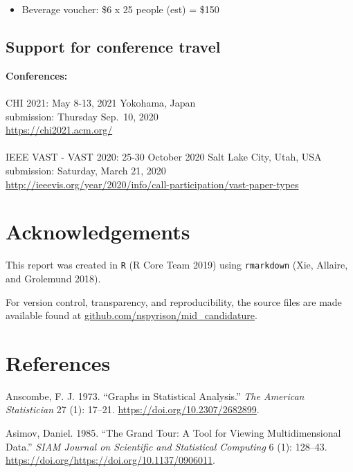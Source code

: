 \documentclass[
  11,
]{article}
\providecommand{\tightlist}{%
  \setlength{\itemsep}{0pt}\setlength{\parskip}{0pt}}
\begin{document}
\begin{itemize}
\tightlist
\item
  Beverage voucher: \$6 x 25 people (est) = \$150
\end{itemize}

\hypertarget{support-for-conference-travel}{%
\subsection{Support for conference travel}\label{support-for-conference-travel}}

\textbf{Conferences:}\\
~\\
CHI 2021: May 8-13, 2021 Yokohama, Japan\\
submission: Thursday Sep.~10, 2020\\
\url{https://chi2021.acm.org/}~\\
~\\
IEEE VAST - VAST 2020: 25-30 October 2020 Salt Lake City, Utah, USA\\
submission: Saturday, March 21, 2020\\
\url{http://ieeevis.org/year/2020/info/call-participation/vast-paper-types}

\hypertarget{sec:acknowledgements}{%
\section{Acknowledgements}\label{sec:acknowledgements}}

This report was created in \texttt{R} (R Core Team 2019) using \texttt{rmarkdown} (Xie, Allaire, and Grolemund 2018).

For version control, transparency, and reproducibility, the source files are made available found at \href{https://github.com/nspyrison/mid_candidature}{github.com/nspyrison/mid\_candidature}.

\hypertarget{references}{%
\section*{References}\label{references}}

\hypertarget{refs}{}
\leavevmode\hypertarget{ref-anscombe_graphs_1973}{}%
Anscombe, F. J. 1973. ``Graphs in Statistical Analysis.'' \emph{The American Statistician} 27 (1): 17--21. \url{https://doi.org/10.2307/2682899}.

\leavevmode\hypertarget{ref-asimov_grand_1985}{}%
Asimov, Daniel. 1985. ``The Grand Tour: A Tool for Viewing Multidimensional Data.'' \emph{SIAM Journal on Scientific and Statistical Computing} 6 (1): 128--43. \url{https://doi.org/https://doi.org/10.1137/0906011}.
\end{document}
